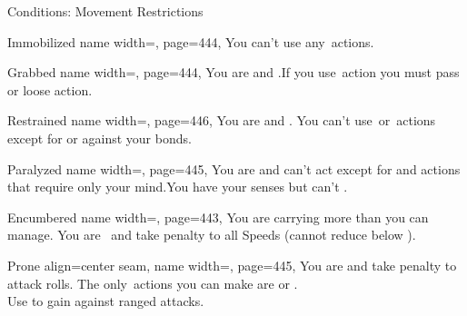 \begin{PageFront}
\begin{Tables}{\frontTableHeight}
\begin{Table}{Conditions: Movement Restrictions}
            \begin{entry}{Immobilized}{%
                name width=\conditionLength,%
                page=444,
            }
                You can't use any \Move\,actions.\hfill {}
            \end{entry}
            \begin{entry}{Grabbed}{%
                name width=\conditionLength,%
                page=444,
            }
                You are \OffGuard and \Immobilized.\hfill If you use \Manipulate\,action you must pass
                \Flat[][val=5] or loose action.
            \end{entry}
            \begin{entry}{Restrained}{%
                name width=\conditionLength,%
                page=446,
            }
                You are \OffGuard and \Immobilized. You can't use \Attack\,or \Manipulate\,actions except
                for  or  against your bonds. \hfill{}
            \end{entry}
            \begin{entry}{Paralyzed}{%
                name width=\conditionLength,%
                page=445,
            }
                You are \OffGuard and can't act except for  and actions that require
                only your mind.\hfill  You have your senses but can't .
            \end{entry}
            \breakLine
            \begin{entry}{Encumbered}{%
                name width=\conditionLength,%
                page=443,
            }
                You are carrying more than you can manage. \hfill You are \Clumsy\, and take  penalty to all Speeds {(cannot reduce below  \Feet)}.
            \end{entry}
            \begin{entry}{Prone}{%
                align=center seam,
                name width=\conditionLength,%
                page=445,
            }
                You are \OffGuard and take  \Cirm penalty to attack rolls. \hfill The only \Move\,actions you
                can make are  or .\\
                Use  to gain \GCover against ranged attacks. \hfill{}
\end{entry}
\end{Table}
\end{Tables}
\end{PageFront}
